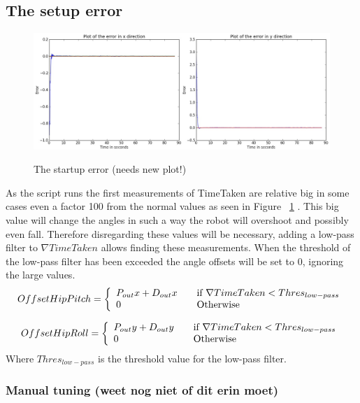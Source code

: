 \documentclass[a4paper]{article}
\begin{document}
\subsection{The setup error}
\begin{figure}[h]
	\centering
	\includegraphics[width=\linewidth]{pics/startupError.jpg}
	\label{fig:startup_error_plot}
	\caption{The startup error (needs new plot!)}
\end{figure} 
As the script runs the first measurements of TimeTaken are relative big in some cases even a factor 100 from the normal values as seen in Figure ~\ref{fig:startup_error_plot} . This big value will change the angles in such a way the robot will overshoot and possibly even fall.
Therefore disregarding these values will be necessary, adding a low-pass filter to $\nabla TimeTaken$ allows finding these measurements. When the threshold of the low-pass filter has been exceeded the angle offsets will be set to 0, ignoring the large values.
\[
  Offset Hip Pitch = \left\{ 
  \begin{array}{l l}
     P_{out}x + D_{out}x& \quad \text{if $\nabla TimeTaken < Thres_{low-pass}$}\\ 
    0 & \quad \text{Otherwise}\\
  \end{array} \right.
\]

\[
  Offset Hip Roll = \left\{ 
  \begin{array}{l l}
     P_{out}y + D_{out}y& \quad \text{if $\nabla TimeTaken < Thres_{low-pass}$}\\ 
    0 & \quad \text{Otherwise}\\
  \end{array} \right.
\]
Where $Thres_{low-pass}$ is the threshold value for the low-pass filter.

\subsubsection{Manual tuning  (weet nog niet of dit erin moet)}
\end{document}
